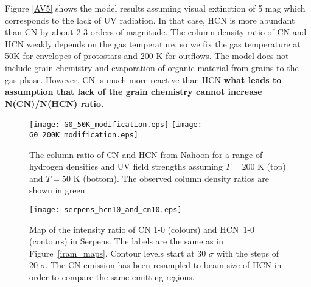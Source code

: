\documentclass{aa}
\begin{document}
Figure \ref{AV5} shows the model results assuming visual extinction of 5 mag which corresponds to the lack 
of UV radiation. In that case, HCN is more abundant than CN by about 2-3
orders of magnitude. The column density ratio of CN and HCN weakly depends on the 
gas temperature, so we fix the gas temperature at 50K for envelopes of protostars and 200 K for outflows. The model does not include grain chemistry and evaporation of organic material from grains to the gas-phase. However, CN is much more reactive than HCN \textbf{what leads to assumption that lack of the grain chemistry cannot increase N(CN)/N(HCN) ratio.}
\begin{figure} 
\centering \texttt{[image: G0\_50K\_modification.eps]} 
\texttt{[image: G0\_200K\_modification.eps]} 
\caption{The column ratio of CN and HCN from Nahoon for a 
range of hydrogen densities and UV field strengths assuming $T = 200$ K (top) 
and $T = 50$ K (bottom). The observed column density ratios are shown in green.} 
\label{G0_50} 
\end{figure}
\begin{figure} 
\centering 
\texttt{[image: serpens\_hcn10\_and\_cn10.eps]}
\caption{Map of the intensity ratio of CN 1-0 (colours) and \mbox{HCN 1-0}
(contours) in Serpens. The labels are the same as in Figure~\ref{iram_maps}. Contour levels start at 30 $\sigma$ with the steps of 20 $\sigma$.
The CN emission has been resampled to beam size of HCN in order to compare the same emitting regions.} 
\label{cn10_and_hcn10} 
\end{figure}
\end{document}
